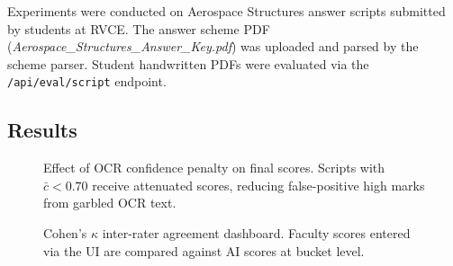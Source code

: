 \documentclass[conference]{IEEEtran}
\begin{document}
Experiments were conducted on Aerospace Structures answer scripts submitted by students at RVCE. The answer scheme PDF (\textit{Aerospace\_Structures\_Answer\_Key.pdf}) was uploaded and parsed by the scheme parser. Student handwritten PDFs were evaluated via the \texttt{/api/eval/script} endpoint.

\subsection{Results}

\begin{figure}[H]
\centering
\caption{Effect of OCR confidence penalty on final scores. Scripts with $\bar{c} < 0.70$ receive attenuated scores, reducing false-positive high marks from garbled OCR text.}
\label{fig:ocr_penalty}
\end{figure}

\begin{figure}[H]
\centering
\caption{Cohen's $\kappa$ inter-rater agreement dashboard. Faculty scores entered via the UI are compared against AI scores at bucket level.}
\label{fig:kappa_result}
\end{figure}
\end{document}
